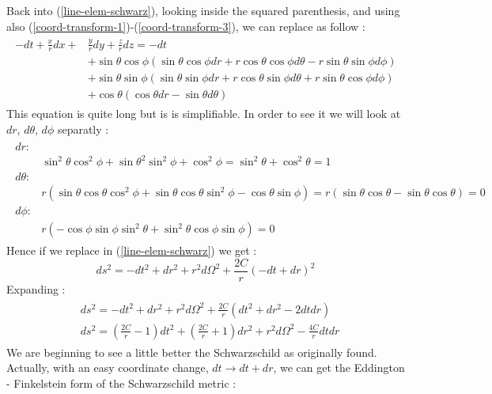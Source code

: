 \documentclass[a4paper,12pt]{article}
\theoremstyle{definition}
\begin{document}
Back into (\ref{line-elem-schwarz}), looking inside the squared parenthesis, and using also (\ref{coord-transform-1})-(\ref{coord-transform-3}), we can replace as follow :
\begin{align}
\begin{split}
	-dt+\frac{x}{r}dx+&\frac{y}{r}dy+\frac{z}{r}dz =-dt\\
	&+\sin{\theta} \cos{\phi} (\sin{\theta} \cos{\phi} dr+r\cos{\theta} \cos{\phi} d\theta -r\sin{\theta} \sin{\phi} d\phi )\\
	&+\sin{\theta} \sin{\phi} (\sin{\theta} \sin{\phi} dr+r\cos{\theta} \sin{\phi} d\theta +r\sin{\theta} \cos{\phi} d\phi )\\
	&+\cos{\theta} (\cos{\theta} dr-\sin{\theta} d\theta )
\end{split}
\end{align}
This equation is quite long but is is simplifiable. In order to see it  we will look at $dr$, $d\theta$, $d\phi$ separatly :
\begin{align}
\begin{split}
	dr :& \\
	&\sin^2{\theta}\cos^2{\phi}+\sin{\theta}^2\sin^2{\phi}+\cos^2{\phi}=\sin^2{\theta}+\cos^2{\theta}=1\\
	d\theta :& \\
	&r(\sin{\theta}\cos{\theta}\cos^2{\phi}+\sin{\theta}\cos{\theta}\sin^2{\phi}-\cos{\theta}\sin{\phi})=r(\sin{\theta}\cos{\theta}-\sin{\theta}\cos{\theta})=0\\
	d\phi :& \\
	&r(-\cos{\phi}\sin{\phi}\sin^2{\theta}+\sin^2{\theta}\cos{\phi}\sin{\phi})=0
\end{split}
\end{align}
Hence if we replace in (\ref{line-elem-schwarz}) we get :
\begin{equation}
	ds^2=-dt^2+dr^2+r^2d\Omega^2+\frac{2C}{r}(-dt+dr)^2
\end{equation}
Expanding :
\begin{align}
\begin{split}
	&ds^2=-dt^2+dr^2+r^2d\Omega^2+\frac{2C}{r}(dt^2+dr^2-2dtdr)\\
	&ds^2=(\frac{2C}{r}-1)dt^2+(\frac{2C}{r}+1)dr^2+r^2d\Omega^2-\frac{4C}{r}dtdr
\end{split}
\end{align}
We are beginning to see a little better the Schwarzschild as originally found.
Actually, with an easy coordinate change, $dt\rightarrow dt+dr$, we can get the Eddington - Finkelstein form of the Schwarzschild metric :
\end{document}
